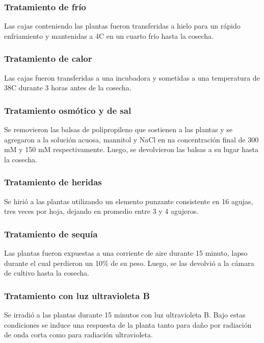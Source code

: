 \subsubsection*{Tratamiento de frío}
Las cajas conteniendo las plantas fueron transferidas a hielo para un rápido enfriamiento y mantenidas a 4\degree C en un cuarto frío hasta la cosecha.
\subsubsection*{Tratamiento de calor}
Las cajas fueron transferidas a una incubadora y sometidas a una temperatura de 38\degree C durante 3 horas antes de la cosecha.
\subsubsection*{Tratamiento osmótico y de sal}
Se removieron las balsas de polipropileno que sostienen a las plantas y se agregaron a la solución acuosa, mannitol y NaCl en na concentración final de 300 mM y 150 mM respectivamente. Luego, se devolvieron las balsas a su lugar hasta la cosecha.
\subsubsection*{Tratamiento de heridas}
Se hirió a las plantas utilizando un elemento punzante consistente en 16 agujas, tres veces por hoja, dejando en promedio entre 3 y 4 agujeros.
\subsubsection*{Tratamiento de sequía}
Las plantas fueron expuestas a una corriente de aire durante 15 minuto, lapso durante el cual perdieron un 10\% de su peso. Luego, se las devolvió a la cámara de cultivo hasta la cosecha.
\subsubsection*{Tratamiento con luz ultravioleta B}
Se irradió a las plantas durante 15 minutos con luz ultravioleta B. Bajo estas condiciones se induce una respuesta de la planta tanto para daño por radiación de onda corta como para radiación ultravioleta. \cite{AtGenExpress, Kilian2007}

